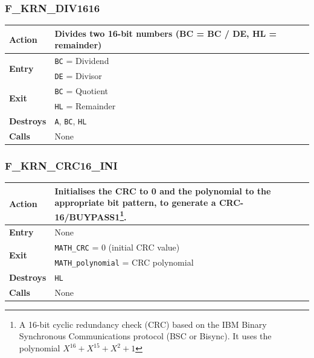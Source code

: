\documentclass[a4paper,11pt]{article}
\begin{document}
        \subsubsection{F\_KRN\_DIV1616}
        \label{func:fkrndiv1616}
        \begin{tabular}{l p{9cm}}
            \hline\textbf{Action}
            & Divides two 16-bit numbers (BC = BC / DE, HL = remainder)\\
            \hline\multirow[t]{2}{4em}{\textbf{Entry}}
            & \texttt{BC} = Dividend\\
            & \texttt{DE} = Divisor\\
            \hline\multirow[t]{2}{4em}{\textbf{Exit}}
            & \texttt{BC} = Quotient\\
            & \texttt{HL} = Remainder\\
            \hline\textbf{Destroys} & \texttt{A}, \texttt{BC}, \texttt{HL} \\
            \hline\textbf{Calls} & None\\
            \hline
        \end{tabular}

        \subsubsection{F\_KRN\_CRC16\_INI}
        \label{func:fkrncrc16ini}
        \begin{tabular}{l p{9cm}}
            \hline\textbf{Action}
            & Initialises the CRC to 0 and the polynomial to the appropriate bit
            pattern, to generate a CRC-16/BUYPASS1\footnote{A 16-bit cyclic redundancy
            check (CRC) based on the IBM Binary Synchronous Communications
            protocol (BSC or Bisync). It uses the polynomial
            $X^{16} + X^{15} +X^2 + 1$}.\\
            \hline\textbf{Entry} & None \\
            \hline\multirow[t]{2}{4em}{\textbf{Exit}}
            & \texttt{MATH\_CRC} = 0 (initial CRC value)\\
            & \texttt{MATH\_polynomial} = CRC polynomial\\
            \hline\textbf{Destroys} & \texttt{HL} \\
            \hline\textbf{Calls} & None\\
            \hline
        \end{tabular}
\end{document}
